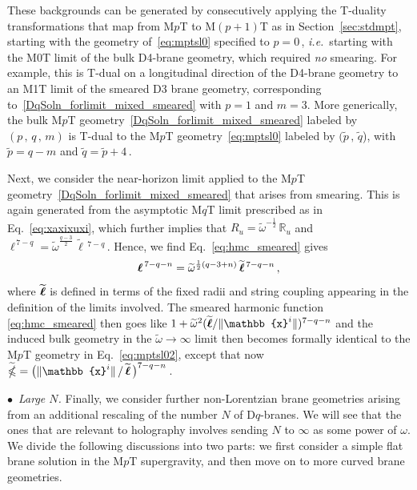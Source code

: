 \documentclass[11pt]{article}
\newcommand{\be}{\begin{equation}}
\newcommand{\ee}{\end{equation}}
\renewcommand{\tilde}[1]{\widetilde{#1}}
\renewcommand{\emph}[1]{\textit{#1}}
\newcommand{\lbb}{\tilde{\ell}}
\begin{document}
These backgrounds can be generated by consecutively applying the T-duality transformations that map from M$p$T to M$(p+1)$T as in Section~\ref{sec:stdmpt}, starting with the geometry of~\eqref{eq:mptsl0} specified to $p=0$\,, \emph{i.e.}~starting with the M0T limit of the bulk D4-brane geometry, which required \emph{no} smearing.
For example, this is T-dual on a longitudinal direction of the D4-brane geometry to an M1T limit of the smeared D3 brane geometry, corresponding to~\eqref{DqSoln_forlimit_mixed_smeared} with $p=1$ and $m=3$. 
More generically, the bulk M$p$T geometry~\eqref{DqSoln_forlimit_mixed_smeared} labeled by $(p\,, \, q\,,\, m)$ is T-dual to the M$p$T geometry~\eqref{eq:mptsl0} labeled by $(\tilde{p}\,, \, \tilde{q}$), with
%
$\tilde{p} = q - m$ and $\tilde{q} = \tilde{p} + 4$\,.

Next, we consider the near-horizon limit applied to the M$p$T geometry~\eqref{DqSoln_forlimit_mixed_smeared} that arises from smearing. This is again generated from the asymptotic M$q$T limit prescribed as in Eq.~\eqref{eq:xaxixuxi}, which further implies that 
%
$R_u = \tilde{\omega}^{-\frac{1}{2}} \, \mathbb{R}_u$ and
$\ell^{\,7-q} = \tilde{\omega}^{\frac{q-3}{2}} \, \lbb{}^{\,7-q}$\,.
%
Hence, we find Eq.~\eqref{eq:hmc_smeared} gives
%
\be
    \ellsmear^{\,7-q-n} = \tilde{\omega}^{\frac{1}{2} (q-3+n)} \, \tilde{\ellsmear}{}^{\,7-q-n}\,,
\ee
where $\tilde{\ellsmear}$ is defined in terms of the fixed radii and string coupling appearing in the definition of the limits involved.
The smeared harmonic function \eqref{eq:hmc_smeared} then goes like $1+ \tilde \omega^2 ( \tilde{\ellsmear} / \|\mathbb{x}^i \|)^{7-q-n}$ and the induced bulk geometry in the $\tilde{\omega} \rightarrow \infty$ limit then becomes formally identical to the M$p$T geometry in Eq.~\eqref{eq:mptsl02}, except that now $\tilde{\mathbb{\Omega}} = \bigl( \| \mathbb{x}^i \| \, / \, \tilde{\ellsmear} \, \bigr)^{7-q-n}$\,.


\vspace{3mm}

\noindent $\bullet$~\emph{Large $N$.} Finally, we consider further non-Lorentzian brane geometries arising from an additional rescaling of the number $N$ of D$q$-branes. We will see that the ones that are relevant to holography involves sending $N$ to $\infty$ as some power of $\omega$. We divide the following discussions into two parts: we first consider a simple flat brane solution in the M$p$T supergravity, and then move on to more curved brane geometries.  
\end{document}
